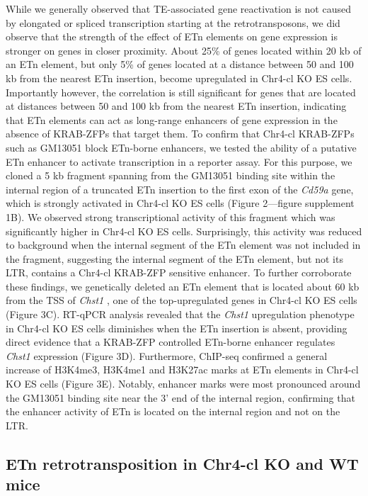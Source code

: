 \documentclass[11pt,a4paper]{article}
\begin{document}
While we generally observed that TE-associated gene reactivation is not caused by elongated or spliced transcription starting at the retrotransposons, we did observe that the strength of the effect of ETn elements on gene expression is stronger on genes in closer proximity. About 25\% of genes located within 20 kb of an ETn element, but only 5\% of genes located at a distance between 50 and 100 kb from the nearest ETn insertion, become upregulated in Chr4-cl KO ES cells. Importantly however, the correlation is still significant for genes that are located at distances between 50 and 100 kb from the nearest ETn insertion, indicating that ETn elements can act as long-range enhancers of gene expression in the absence of KRAB-ZFPs that target them. To confirm that Chr4-cl KRAB-ZFPs such as GM13051 block ETn-borne enhancers, we tested the ability of a putative ETn enhancer to activate transcription in a reporter assay. For this purpose, we cloned a 5 kb fragment spanning from the GM13051 binding site within the internal region of a truncated ETn insertion to the first exon of the \textit{Cd59a} gene, which is strongly activated in Chr4-cl KO ES cells (Figure 2—figure supplement 1B). We observed strong transcriptional activity of this fragment which was significantly higher in Chr4-cl KO ES cells. Surprisingly, this activity was reduced to background when the internal segment of the ETn element was not included in the fragment, suggesting the internal segment of the ETn element, but not its LTR, contains a Chr4-cl KRAB-ZFP sensitive enhancer. To further corroborate these findings, we genetically deleted an ETn element that is located about 60 kb from the TSS of \textit{Chst1} , one of the top-upregulated genes in Chr4-cl KO ES cells (Figure 3C). RT-qPCR analysis revealed that the \textit{Chst1} upregulation phenotype in Chr4-cl KO ES cells diminishes when the ETn insertion is absent, providing direct evidence that a KRAB-ZFP controlled ETn-borne enhancer regulates \textit{Chst1} expression (Figure 3D). Furthermore, ChIP-seq confirmed a general increase of H3K4me3, H3K4me1 and H3K27ac marks at ETn elements in Chr4-cl KO ES cells (Figure 3E). Notably, enhancer marks were most pronounced around the GM13051 binding site near the 3’ end of the internal region, confirming that the enhancer activity of ETn is located on the internal region and not on the LTR.

\subsection{ETn retrotransposition in Chr4-cl KO and WT mice}
\end{document}
